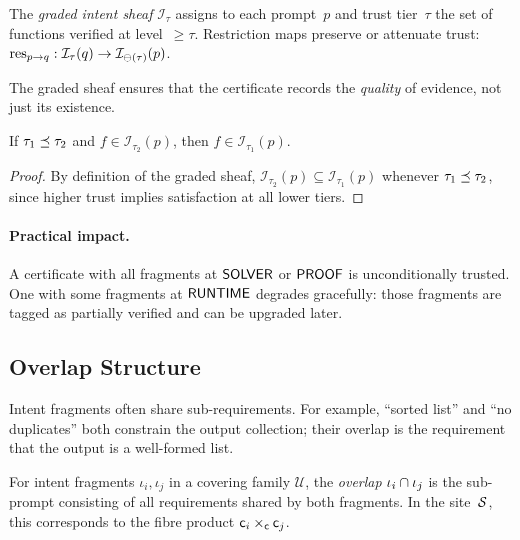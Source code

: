 \documentclass[11pt]{article}
\newcommand{\IntentSheaf}{\mathcal{I}}
\newcommand{\IntentFrag}{\iota}
\newcommand{\CoverFam}{\mathcal{U}}
\begin{document}
\begin{definition}\label{def:graded-sheaf}
The \emph{graded intent sheaf} $\IntentSheaf_\tau$ assigns to each
prompt~$p$ and trust tier~$\tau$ the set of functions verified at
level~$\geq \tau$.  Restriction maps preserve or attenuate trust:
$\res_{p \to q} : \IntentSheaf_\tau(q) \to
\IntentSheaf_{\tatten(\tau)}(p)$.
\end{definition}

The graded sheaf ensures that the certificate records the
\emph{quality} of evidence, not just its existence.

\begin{lemma}\label{lem:trust-mono}
If $\tau_1 \preceq \tau_2$ and $f \in \IntentSheaf_{\tau_2}(p)$, then
$f \in \IntentSheaf_{\tau_1}(p)$.
\end{lemma}

\begin{proof}
By definition of the graded sheaf, $\IntentSheaf_{\tau_2}(p)
\subseteq \IntentSheaf_{\tau_1}(p)$ whenever $\tau_1 \preceq \tau_2$,
since higher trust implies satisfaction at all lower tiers.
\end{proof}

\paragraph{Practical impact.}
A certificate with all fragments at $\mathsf{SOLVER}$ or $\mathsf{PROOF}$ is
unconditionally trusted.  One with some fragments at $\mathsf{RUNTIME}$
degrades gracefully: those fragments are tagged as partially verified
and can be upgraded later.

\subsection{Overlap Structure}\label{sec:overlap-structure}

Intent fragments often share sub-requirements.  For example,
``sorted list'' and ``no duplicates'' both constrain the output
collection; their overlap is the requirement that the output is a
well-formed list.

\begin{definition}\label{def:intent-overlap}
For intent fragments $\IntentFrag_i, \IntentFrag_j$ in a covering
family $\CoverFam$, the \emph{overlap}
$\overlap{\IntentFrag_i}{\IntentFrag_j}$ is the sub-prompt consisting
of all requirements shared by both fragments.  In the site~$\mathcal{S}$,
this corresponds to the fibre product
$\mathsf{c}_i \times_{\mathsf{c}} \mathsf{c}_j$.
\end{definition}
\end{document}
